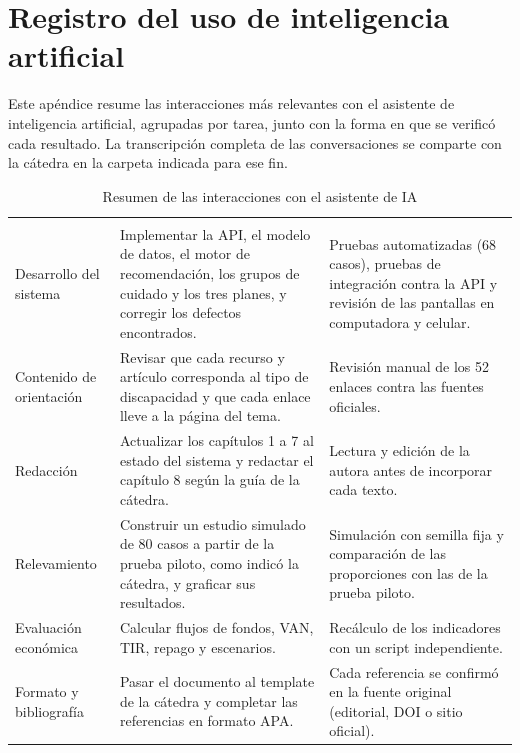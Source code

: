 
\chapter{Registro del uso de inteligencia artificial}\label{apx:registro-ia}

Este apéndice resume las interacciones más relevantes con el asistente de
inteligencia artificial, agrupadas por tarea, junto con la forma en que se
verificó cada resultado. La transcripción completa de las conversaciones se
comparte con la cátedra en la carpeta indicada para ese fin.

{\small
\begin{xltabular}{\textwidth}{>{\raggedright\arraybackslash}p{3.2cm} >{\raggedright\arraybackslash}X >{\raggedright\arraybackslash}X}
\caption{Resumen de las interacciones con el asistente de IA}\label{tab:registro-ia}\\
\toprule
{} &  &  \\
\midrule
\endfirsthead
\toprule
{} &  &  \\
\midrule
\endhead
\bottomrule
\endfoot
Desarrollo del sistema & Implementar la API, el modelo de datos, el motor de recomendación, los grupos de cuidado y los tres planes, y corregir los defectos encontrados. & Pruebas automatizadas (68 casos), pruebas de integración contra la API y revisión de las pantallas en computadora y celular. \\
Contenido de orientación & Revisar que cada recurso y artículo corresponda al tipo de discapacidad y que cada enlace lleve a la página del tema. & Revisión manual de los 52 enlaces contra las fuentes oficiales. \\
Redacción & Actualizar los capítulos 1 a 7 al estado del sistema y redactar el capítulo 8 según la guía de la cátedra. & Lectura y edición de la autora antes de incorporar cada texto. \\
Relevamiento & Construir un estudio simulado de 80 casos a partir de la prueba piloto, como indicó la cátedra, y graficar sus resultados. & Simulación con semilla fija y comparación de las proporciones con las de la prueba piloto. \\
Evaluación económica & Calcular flujos de fondos, VAN, TIR, repago y escenarios. & Recálculo de los indicadores con un script independiente. \\
Formato y bibliografía & Pasar el documento al template de la cátedra y completar las referencias en formato APA. & Cada referencia se confirmó en la fuente original (editorial, DOI o sitio oficial). \\
\end{xltabular}
}

